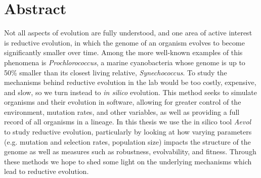 




%
\newpage

\chapter*{Abstract}
Not all aspects of evolution are fully understood, and one area of active interest is reductive evolution, in which the genome of an organism evolves to become significantly smaller over time. Among the more well-known examples of this phenomena is \textit{Prochlorococcus}, a marine cyanobacteria whose genome is up to 50\% smaller than its closest living relative, \textit{Synechococcus}. To study the mechanisms behind reductive evolution in the lab would be too costly, expensive, and slow, so we turn instead to \textit{in silico} evolution. This method seeks to simulate organisms and their evolution in software, allowing for greater control of the environment, mutation rates, and other variables, as well as providing a full record of all organisms in a lineage. In this thesis we use the in silico tool \textit{Aevol} to study reductive evolution, particularly by looking at how varying parameters (e.g. mutation and selection rates, population size) impacts the structure of the genome as well as measures such as robustness, evolvability, and fitness. Through these methods we hope to shed some light on the underlying mechanisms which lead to reductive evolution. 



\linespread{1.25}\selectfont

\tableofcontents
{}
\listoffigures  
\listoftables
\blankpage





%

\blankpage

